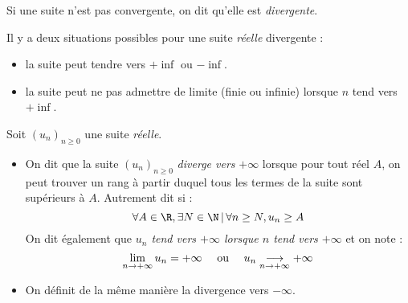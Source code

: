 \documentclass[french,11pt,twoside]{VcCours}
\begin{document}
\begin{Demonstration}{}

\vspace{11cm}
%
%
%

\end{Demonstration}

\begin{Definition}{}
	Si une suite n'est pas convergente, on dit qu'elle est \emph{divergente}.
\end{Definition}

Il y a deux situations possibles pour une suite \emph{réelle} divergente :
\begin{itemize}
 \item la suite peut tendre vers $+\inf$ ou $-\inf$.
 \item la suite peut ne pas admettre de limite (finie ou infinie) lorsque $n$ tend vers $+\inf$.
\end{itemize}


\begin{Definition}{}
Soit $(u_n)_{n \geq 0}$ une suite \emph{réelle}.
\begin{itemize}
\item On dit que la suite $(u_n)_{n \geq 0}$ \emph{diverge vers} $+\infty$ lorsque pour tout réel $A$, on peut trouver un rang à partir duquel tous les termes de la suite sont supérieurs à $A$. Autrement dit si :
$$\forall A \in \R, \exists N \in \N \, \vert \, \forall n \ge N, u_n \geq A $$
On dit également que \emph{$u_n$ tend vers $+\infty$ lorsque $n$ tend vers $+\infty$} et on note :
$$\displaystyle{\lim_{n \rightarrow +\infty}u_n=+\infty} \quad \hbox{ ou } \quad u_n \underset{n \rightarrow + \infty}{\longrightarrow} + \infty $$
\item On définit de la même manière la divergence vers $- \infty$.
\end{itemize}
\end{Definition}
\end{document}
